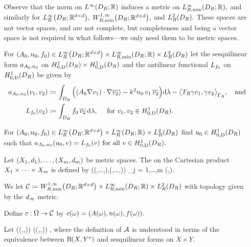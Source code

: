 Observe that the norm on $\LiDRRR$ induces a metric on $\LiRminDRRR,$ and similarly for $\LiRDRRRdtd,$ $\WoiRminDRRRdtd,$ and $\LtRDR.$ These spaces are not vector spaces, and are not complete, but completeness and being a vector space is not required in what follows---we only need them to be metric spaces.



\noindent For $\mleft(\Az,\nz,\fz\mright) \in \LiRDRRRdtd \times \LiRminDRRR \times \LtRDR$ let the sesquilinear form $a_{A_{0},n_{0}}$ on $\HozDDR \times \HozDDR$  and the antilinear functional $L_{f_{0}}$ on $\HozDDR$ be given by
\begin{align*}
\aGm\mleft(\vo,\vt\mright) &\de \int_{D_R} \Big(\mleft(\Az \grad \vo\mright)\cdot \grad \vtb \rangle 
 - k^2 \nz\, \vo\,\vtb \Big)\dd\Leb- \big\langle T_R \gamma \vo,\gamma \vt\big\rangle_{\Gamma_R}, \quad\text{and}\\
 \Lh(\vt) &\de \int_{D_R} \fz\, \vtb\,\dd\Leb, \quad\text{ for } \vo, \vt \in \HozDDR.
\end{align*}
\ede

\label{prob:edp}
For $\mleft(\Az,\nz,\fz\mright) \in \LiRDRRRdtd \times \LiRDRRR \times \LtRDR$ find 
$\uz \in \HozDDR$ such that $\aGm(\uz,v) = \Lh(v) \tforall v \in \HozDDR.$
\eprob

\label{def:dinfty}
Let $\mleft(\Xo,\done\mright),\ldots,\mleft(\Xm,\dm\mright)$ be metric spaces. The  on the Cartesian product $X_{1}\times\cdots\times X_{m}$ is defined by
\beqs
\dinfty\mleft(\mleft(\xo,\ldots,\xm\mright),\mleft(\yo,\ldots,\ym\mright)\mright) \de \max_{j = 1,\ldots,m} \dmetj\mleft(\xj,\yj\mright).
\eeqs
\ede


\label{def:cCHh}
We let
$\cC \de \WoiRminDRRRdtd \times \LiRminDRRR \times \LtRDR$
with topology given by the $d_{\infty}$ metric.
\ede


\label{def:inputmap}
Define $c:\Omega\rightarrow\mathcal C$ by
$\coeff(\omega) = \mleft(A(\omega),n(\omega),f(\omega)\mright).$
\ede

Let
\beq\label{eq:hhform}
\toform\mleft(\mleft(\Az,\nz,\fz\mright)\mright) \de \aGm \quad {} \quad \rhs\mleft(\mleft(\Az,\nz,\fz\mright)\mright) \de \Lh,
\eeq
where the definition of $\mathcal A$ is understood in terms of the equivalence between $\homspace$ and sesquilinear forms on $X \times Y.$
\ede

